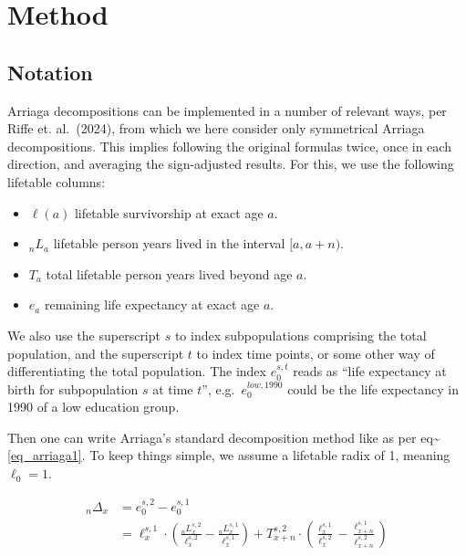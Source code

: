 \documentclass[sn-apa,pdflatex]{sn-jnl}
\theoremstyle{remark}
\theoremstyle{definition}
\begin{document}
\hypertarget{method}{%
\section{Method}\label{method}}

\hypertarget{notation}{%
\subsection{Notation}\label{notation}}

Arriaga decompositions can be implemented in a number of relevant ways,
per Riffe et. al.~(2024), from which we here consider only symmetrical
Arriaga decompositions. This implies following the original formulas
twice, once in each direction, and averaging the sign-adjusted results.
For this, we use the following lifetable columns:

\begin{itemize}

\item{$\ell(a)$} lifetable survivorship at exact age $a$.

\item{${}_nL_a$} lifetable person years lived in the interval $[a,a+n)$.

\item{$T_a$} total lifetable person years lived beyond age $a$.

\item{$e_a$} remaining life expectancy at exact age $a$.

\end{itemize}

We also use the superscript \(s\) to index subpopulations comprising the
total population, and the superscript \(t\) to index time points, or
some other way of differentiating the total population. The index
\(e^{s,t}_0\) reads as ``life expectancy at birth for subpopulation
\(s\) at time \(t\)'', e.g.~\(e^{low, 1990}_0\) could be the life
expectancy in 1990 of a low education group.

Then one can write Arriaga's standard decomposition method like as per
eq\textasciitilde{}\eqref{eq_arriaga1}. To keep things simple, we assume
a lifetable radix of 1, meaning \(\ell_0 = 1\).

\[
\begin{aligned}
{}_n\Delta_x &= e_0^{s,2} - e_0^{s,1} \\
 &= \ell_x^{s,1} \cdot \left( \frac{{}_nL_x^{s,2}}{\ell_x^{s,2}} - \frac{{}_nL_x^{s,1}}{\ell_x^{s,1}}\right)+T_{x+n}^{s,2}\cdot\left(\frac{\ell_x^{s,1}}{\ell_x^{s,2}} - \frac{\ell_{x+n}^{s,1}}{\ell_{x+n}^{s,2}}\right)
\end{aligned}
\]
\end{document}

